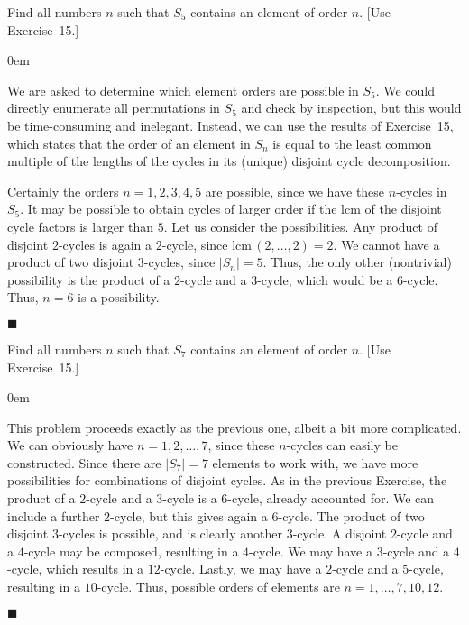 \documentclass[12pt]{article}
\renewcommand{\qed}{\hfill$\blacksquare$}
\renewenvironment{proof}{\begin{addmargin}[1em]{0em}\begin{newproof}}{\end{newproof}\end{addmargin}\qed}
\newenvironment{problem}[2][Exercise]{\begin{trivlist}
\item[\hskip \labelsep {\bfseries #1}\hskip \labelsep {\bfseries #2.}]}{\end{trivlist}}
\begin{document}
\begin{problem}{1.3.18}
Find all numbers $n$ such that $S_5$ contains an element of order $n$. [Use Exercise~15.]
\end{problem}
\begin{proof}
We are asked to determine which element orders are possible in $S_5$. We could directly enumerate all permutations in $S_5$ and check by inspection, but this would be time-consuming and inelegant. Instead, we can use the results of Exercise~15, which states that the order of an element in $S_n$ is equal to the least common multiple of the lengths of the cycles in its (unique) disjoint cycle decomposition.

Certainly the orders $n=1,2,3,4,5$ are possible, since we have these $n$-cycles in $S_5$. It may be possible to obtain cycles of larger order if the $\text{lcm}$ of the disjoint cycle factors is larger than $5$. Let us consider the possibilities. Any product of disjoint $2$-cycles is again a $2$-cycle, since $\text{lcm}\,\left(2,\ldots,2\right)=2$. We cannot have a product of two disjoint $3$-cycles, since $\left|S_n\right|=5$. Thus, the only other (nontrivial) possibility is the product of a $2$-cycle and a $3$-cycle, which would be a $6$-cycle. Thus, $n=6$ is a possibility.
\end{proof}





\begin{problem}{1.3.19}
Find all numbers $n$ such that $S_7$ contains an element of order $n$. [Use Exercise~15.]
\end{problem}
\begin{proof}
This problem proceeds exactly as the previous one, albeit a bit more complicated. We can obviously have $n=1,2,\ldots,7$, since these $n$-cycles can easily be constructed. Since there are $\left|S_7\right|=7$ elements to work with, we have more possibilities for combinations of disjoint cycles. As in the previous Exercise, the product of a $2$-cycle and a $3$-cycle is a $6$-cycle, already accounted for. We can include a further $2$-cycle, but this gives again a $6$-cycle. The product of two disjoint $3$-cycles is possible, and is clearly another $3$-cycle. A disjoint $2$-cycle and a $4$-cycle may be composed, resulting in a $4$-cycle. We may have a $3$-cycle and a $4$-cycle, which results in a $12$-cycle. Lastly, we may have a $2$-cycle and a $5$-cycle, resulting in a $10$-cycle. Thus, possible orders of elements are $n=1,\ldots,7,10,12$.
\end{proof}
\end{document}
